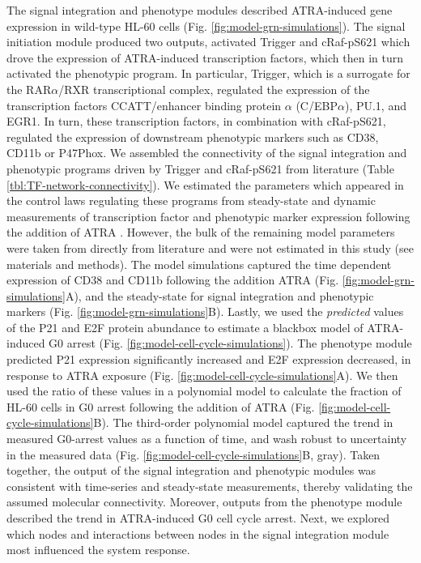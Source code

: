 \documentclass[12pt]{article}
\begin{document}
The signal integration and phenotype modules described ATRA-induced gene expression in wild-type HL-60 cells (Fig. \ref{fig:model-grn-simulations}).
The signal initiation module produced two outputs, activated Trigger and cRaf-pS621 which drove the expression of ATRA-induced transcription factors,
which then in turn activated the phenotypic program. In particular, Trigger, which is a surrogate for the RAR$\alpha$/RXR transcriptional complex,
regulated the expression of the transcription factors CCATT/enhancer binding protein $\alpha$ (C/EBP$\alpha$), PU.1, and EGR1.
In turn, these transcription factors, in combination with cRaf-pS621, regulated the expression of downstream phenotypic markers such as CD38, CD11b or P47Phox.
We assembled the connectivity of the signal integration and phenotypic programs driven by Trigger and cRaf-pS621 from literature (Table \ref{tbl:TF-network-connectivity}).
We estimated the parameters which appeared in the control laws regulating these programs
from steady-state and dynamic measurements of transcription factor and phenotypic marker expression following the addition of ATRA \cite{Jensen:2013aa,Jensen:2014aa,Jensen:2015ab,Jensen:2015aa}.
However, the bulk of the remaining model parameters were taken from directly from literature \cite{Milo:2010aa} and were not estimated in this study (see materials and methods).
The model simulations captured the time dependent expression of CD38 and CD11b following the addition ATRA (Fig. \ref{fig:model-grn-simulations}A),
and the steady-state for signal integration and phenotypic markers (Fig. \ref{fig:model-grn-simulations}B).
Lastly, we used the \textit{predicted} values of the P21 and E2F protein abundance to estimate a blackbox model of ATRA-induced G0 arrest (Fig. \ref{fig:model-cell-cycle-simulations}).
The phenotype module predicted P21 expression significantly increased and E2F expression decreased, in response to ATRA exposure (Fig. \ref{fig:model-cell-cycle-simulations}A).
We then used the ratio of these values in a polynomial model to calculate the fraction of HL-60 cells in G0 arrest following the addition of ATRA (Fig. \ref{fig:model-cell-cycle-simulations}B).
The third-order polynomial model captured the trend in measured G0-arrest values as a function of time, and wash robust to uncertainty in the measured data (Fig. \ref{fig:model-cell-cycle-simulations}B, gray).
Taken together, the output of the signal integration and phenotypic modules was consistent with time-series and steady-state measurements, thereby validating the assumed molecular connectivity.
Moreover, outputs from the phenotype module described the trend in ATRA-induced G0 cell cycle arrest.
Next, we explored which nodes and interactions between nodes in the signal integration module most influenced the system response.
\end{document}
